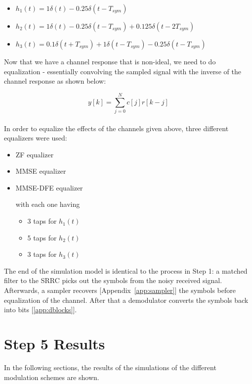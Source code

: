 \documentclass[]{article}
\begin{document}
\begin{itemize}
\item $h_1(t) = 1\delta(t) - 0.25\delta(t - T_{sym})  $
\item $h_2(t) = 1\delta(t) - 0.25\delta(t - T_{sym})   + 0.125\delta(t - 2T_{sym}) $
\item $h_3(t) = 0.1\delta(t + T_{sym}) +1\delta(t - T_{sym}) - 0.25\delta(t - T_{sym})   $
\end{itemize} 

Now that we have a channel response that is non-ideal, we need to do equalization - essentially convolving the sampled signal with the inverse of the channel response as shown below: 

\begin{equation}
\label{eq:channel}
y\left[k\right] = \sum_{j=0}^N c[j]r\left[k-j\right]
\end{equation}
\\
In order to equalize the effects of the channels given above, three different equalizers were used: 

\begin{itemize}
\item ZF equalizer
\item MMSE equalizer
\item MMSE-DFE equalizer

with each one having
	\begin{itemize}
	\item 3 taps for $h_1(t)$
	\item 5 taps for $h_2(t)$
	\item 3 taps for $h_3(t)$
	\end{itemize}

\end{itemize}


The end of the simulation model is identical to the process in Step 1: a matched filter to the SRRC picks out the symbols from the noisy received signal.  Afterwards, a sampler recovers [Appendix~\ref{app:sampler}] the symbols before equalization of the channel. After that a demodulator converts the symbols back into bits [\ref{app:dblocks}].  



\section{Step 5 Results}
\label{sec:results}
In the following sections, the results of the simulations of the different modulation schemes are shown. 
\end{document}
